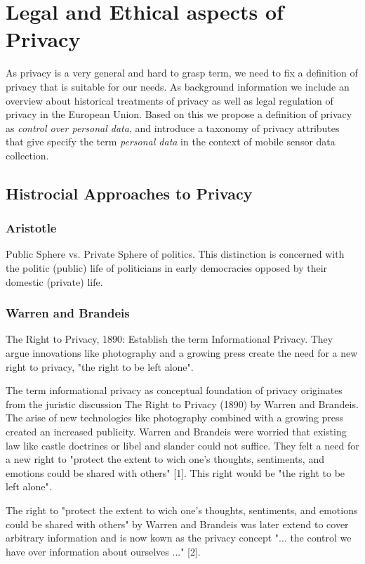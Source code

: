\chapter{Legal and Ethical aspects of Privacy}

As privacy is a very general and hard to grasp term, we need to fix a definition of privacy that is suitable for our needs.
As background information we include an overview about historical treatments of privacy as well as legal regulation of privacy in the European Union.
Based on this we propose a definition of privacy as {\em control over personal data}, and introduce a taxonomy of privacy attributes that give specify the term {\em personal data} in the context of mobile sensor data collection.

\section{Histrocial Approaches to Privacy}

\subsection{Aristotle}

Public Sphere vs. Private Sphere of politics. This distinction is concerned with the politic (public) life of politicians in early democracies opposed by their domestic (private) life.

\subsection{Warren and Brandeis}

The Right to Privacy, 1890: Establish the term Informational Privacy. They argue innovations like photography and a growing press create the need for a new right to privacy, "the right to be left alone".

The term informational privacy as conceptual foundation of privacy originates from the juristic discussion The Right to Privacy (1890) by Warren and Brandeis.
The arise of new technologies like photography combined with a growing press created an increased publicity.
Warren and Brandeis were worried that existing law like castle doctrines or libel and slander could not suffice.
They felt a need for a new right to "protect the extent to wich one's thoughts, sentiments, and emotions could be shared with others" [1].
This right would be "the right to be left alone".

The right to "protect the extent to wich one's thoughts, sentiments, and emotions could be shared with others" by Warren and Brandeis was later extend to cover arbitrary information and is now kown as the privacy concept "... the control we have over information about ourselves ..." [2].

